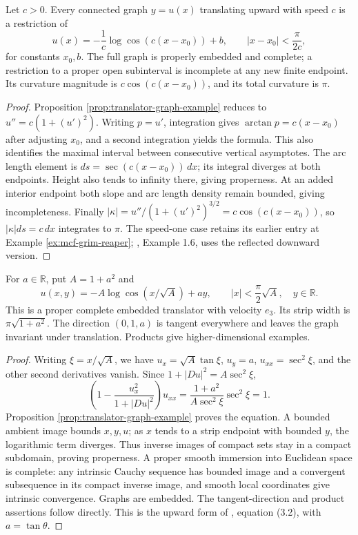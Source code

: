 \begin{proposition}\label{prop:grim-reaper-speed-family}
Let $c>0$. Every connected graph $y=u(x)$ translating upward with speed $c$ is a restriction of
\[
 u(x)=-\frac1c\log\cos(c(x-x_0))+b,
 \qquad |x-x_0|<\frac{\pi}{2c},
\]
for constants $x_0,b$. The full graph is properly embedded and complete; a restriction to a proper open subinterval is incomplete at any new finite endpoint. Its curvature magnitude is $c\cos(c(x-x_0))$, and its total curvature is $\pi$.
\end{proposition}
\begin{proof}
Proposition \ref{prop:translator-graph-example} reduces to $u''=c(1+(u')^2)$. Writing $p=u'$, integration gives $\arctan p=c(x-x_0)$ after adjusting $x_0$, and a second integration yields the formula. This also identifies the maximal interval between consecutive vertical asymptotes. The arc length element is $ds=\sec(c(x-x_0))\,dx$; its integral diverges at both endpoints. Height also tends to infinity there, giving properness. At an added interior endpoint both slope and arc length density remain bounded, giving incompleteness. Finally $|\kappa|=u''/(1+(u')^2)^{3/2}=c\cos(c(x-x_0))$, so $|\kappa|ds=c\,dx$ integrates to $\pi$. The speed-one case retains its earlier entry at Example \ref{ex:mcf-grim-reaper}; \cite{HIMW19}, Example 1.6, uses the reflected downward version.
\end{proof}

\begin{example}\label{ex:tilted-grim-reaper}
For $a\in\mathbb R$, put $A=1+a^2$ and
\[
 u(x,y)=-A\log\cos(x/\sqrt A)+ay,
 \qquad |x|<\frac\pi2\sqrt A,\quad y\in\mathbb R.
\]
This is a proper complete embedded translator with velocity $e_3$. Its strip width is $\pi\sqrt{1+a^2}$. The direction $(0,1,a)$ is tangent everywhere and leaves the graph invariant under translation. Products give higher-dimensional examples.
\end{example}
\begin{proof}
Writing $\xi=x/\sqrt A$, we have $u_x=\sqrt A\tan\xi$, $u_y=a$, $u_{xx}=\sec^2\xi$, and the other second derivatives vanish. Since $1+|Du|^2=A\sec^2\xi$,
\[
 \left(1-\frac{u_x^2}{1+|Du|^2}\right)u_{xx}
 =\frac{1+a^2}{A\sec^2\xi}\sec^2\xi=1.
\]
Proposition \ref{prop:translator-graph-example} proves the equation. A bounded ambient image bounds $x,y,u$; as $x$ tends to a strip endpoint with bounded $y$, the logarithmic term diverges. Thus inverse images of compact sets stay in a compact subdomain, proving properness. A proper smooth immersion into Euclidean space is complete: any intrinsic Cauchy sequence has bounded image and a convergent subsequence in its compact inverse image, and smooth local coordinates give intrinsic convergence. Graphs are embedded. The tangent-direction and product assertions follow directly. This is the upward form of \cite{HIMW19}, equation (3.2), with $a=\tan\theta$.
\end{proof}

